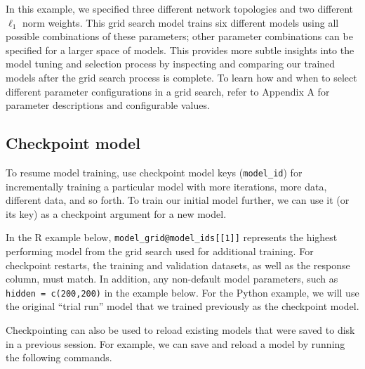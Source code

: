 \waterExampleInR


%


\normalsize
\noindent
In this example, we specified three different network topologies and two different $\ell_1$ norm weights. This grid search model trains six different models using all possible combinations of these parameters; other parameter combinations can be specified for a larger space of models. This provides more subtle insights into the model tuning and selection process by inspecting and comparing our trained models after the grid search process is complete. To learn how and when to select different parameter configurations in a grid search, refer to Appendix A for parameter descriptions and configurable values. 

\waterExampleInR


%


\subsection{Checkpoint model}

To resume model training, use checkpoint model keys (\texttt{model_id}) for incrementally training a particular model with more iterations, more data, different data, and so forth. To train our initial model further, we can use it (or its key) as a checkpoint argument for a new model.

In the R example below, \texttt{model\_grid@model\_ids[[1]]} represents the highest performing model from the grid search used for additional training. For checkpoint restarts, the training and validation datasets, as well as the response column, must match.  In addition, any non-default model parameters, such as \texttt{hidden = c(200,200)} in the example below.  For the Python example, we will use the original ``trial run'' model that we trained previously as the checkpoint model.

\waterExampleInR


\waterExampleInPython


\noindent
Checkpointing can also be used to reload existing models that were saved to disk in a previous session. For example, we can save and reload a model by running the following commands.

